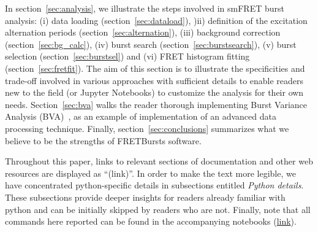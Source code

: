 In section~\ref{sec:analysis}, we illustrate the steps involved
in smFRET burst analysis: (i) data loading (section~\ref{sec:dataload}), )ii) definition of the
excitation alternation periods (section~\ref{sec:alternation}), (iii) background
correction (section~\ref{sec:bg_calc}), (iv) burst search (section~\ref{sec:burstsearch}),
(v) burst selection (section~\ref{sec:burstsel}) and (vi) FRET histogram fitting (section~\ref{sec:fretfit}).
The aim of this section is to illustrate the specificities and trade-off involved in various approaches
with sufficient details to enable readers new to the field (or Jupyter Notebooks) to customize the analysis for their own needs.
Section~\ref{sec:bva} walks the reader thorough implementing
Burst Variance Analysis (BVA)~\cite{Torella_2011}, as an example of implementation of an advanced data processing technique.
Finally, section~\ref{sec:conclusions} summarizes what we believe to be
the strengths of FRETBursts software.

Throughout this paper,
links to relevant sections of documentation and other web resources
are displayed as ``(link)''.
In order to make the text more legible,
we have concentrated python-specific details in subsections entitled
\textit{Python details}. These subsections provide deeper insights for readers
already familiar with python and can be initially skipped by readers who are not.
Finally, note that all commands here reported can be found in the
accompanying notebooks
(\href{https://github.com/tritemio/fretbursts_paper}{link}).

